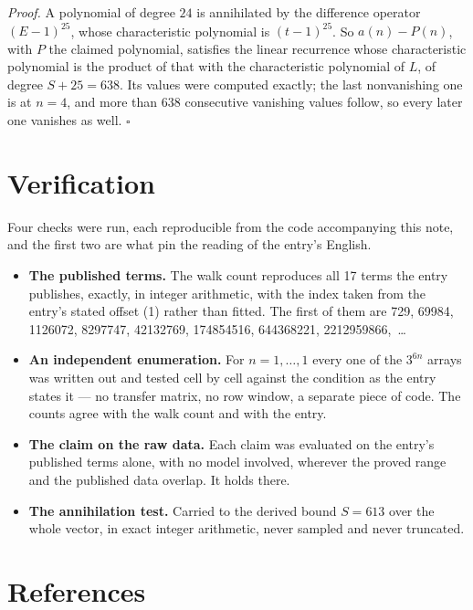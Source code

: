 \documentclass[11pt]{article}
\theoremstyle{definition}
\begin{document}
{\itshape Proof.} A polynomial of degree $24$ is annihilated by the difference operator $(E-1)^{25}$, whose characteristic polynomial is $(t-1)^{25}$. So $a(n) - P(n)$, with $P$ the claimed polynomial, satisfies the linear recurrence whose characteristic polynomial is the product of that with the characteristic polynomial of $L$, of degree $S + 25 = 638$. Its values were computed exactly; the last nonvanishing one is at $n = 4$, and more than $638$ consecutive vanishing values follow, so every later one vanishes as well. $\square$

\section{Verification}

Four checks were run, each reproducible from the code accompanying this note, and the first two are what pin the reading of the entry's English.

\begin{itemize}

\item {\bfseries The published terms.} The walk count reproduces all 17 terms the entry publishes, exactly, in integer arithmetic, with the index taken from the entry's stated offset (1) rather than fitted. The first of them are 729, 69984, 1126072, 8297747, 42132769, 174854516, 644368221, 2212959866,~\dots

\item {\bfseries An independent enumeration.} For $n = 1,\dots,1$ every one of the $3^{6n}$ arrays was written out and tested cell by cell against the condition as the entry states it --- no transfer matrix, no row window, a separate piece of code. The counts agree with the walk count and with the entry.

\item {\bfseries The claim on the raw data.} Each claim was evaluated on the entry's published terms alone, with no model involved, wherever the proved range and the published data overlap. It holds there.

\item {\bfseries The annihilation test.} Carried to the derived bound $S = 613$ over the whole vector, in exact integer arithmetic, never sampled and never truncated.

\end{itemize}

\section{References}
\end{document}
